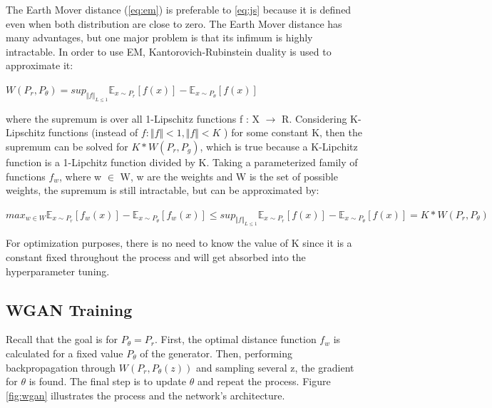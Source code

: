 The Earth Mover distance (\ref{eq:em}) is preferable to \ref{eq:js} because it is defined even when both distribution are close to zero. The Earth Mover distance has many advantages, but one major problem is that its infimum is highly intractable. In order to use EM, Kantorovich-Rubinstein duality is used to approximate it:
\begin{center}
	$W(P_{r},P_{\theta}) = sup_{\Vert f \Vert_{L \leq 1}} \mathbb{E}_{x \sim P_{r}}[f(x)] - \mathbb{E}_{x \sim P_{\theta}}[f(x)] $
\end{center}
where the supremum is over all 1-Lipschitz functions f : X $\rightarrow$ R. Considering K-Lipschitz functions (instead of $f : \Vert f \Vert < 1, \Vert f \Vert < K$ ) for some constant K, then the supremum can be solved  for $K*W(P_{r}, P_{g})$, which is true because a K-Lipchitz function is a 1-Lipchitz function divided by K. Taking a parameterized family of  functions $f_{w}$, where w $\in$ W, w are the weights and W is the set of possible weights,  the supremum is still intractable, but can be approximated by:

\begin{center}
	$ max_{w \in W} \mathbb{E}_{x \sim P_{r}}[f_{w}(x)] - \mathbb{E}_{x \sim P_{\theta}}[f_{w}(x)] \leq sup_{\Vert f \Vert_{L \leq 1}} \mathbb{E}_{x \sim P_{r}}[f(x)] - \mathbb{E}_{x \sim P_{\theta}}[f(x)] = K * W(P_{r}, P_{\theta}) $
\end{center}

For optimization purposes, there is no need to know the value of K since it is a constant fixed throughout the process and will get absorbed into the hyperparameter tuning.


\subsection {WGAN Training}

Recall that the goal is for $P_{\theta}=P_{r}$. First, the optimal distance function $f_{w}$ is calculated for a fixed value $P_{\theta}$ of the generator. Then,  performing  backpropagation through $W(P_{r}, P_{\theta}(z))$ and sampling several z, the gradient for $\theta$ is found. The final step is to update $\theta$ and repeat the process. Figure \ref{fig:wgan} illustrates the process and the network's architecture. 


